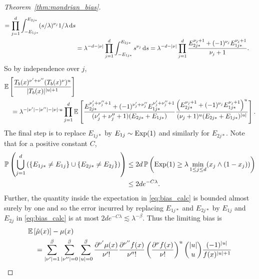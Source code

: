 \begin{proof}[Theorem~\ref{thm:mondrian_bias}]
\begin{align*}
    = \prod_{j=1}^d
    \int_{-E_{1j*}}^{E_{2j*}} (s / \lambda)^{\nu_j} 1/\lambda \,\mathrm{d}s \\
    &=
    \lambda^{-d - |\nu|}
    \prod_{j=1}^d
    \int_{-E_{1j*}}^{E_{2j*}} s^{\nu_j} \,\mathrm{d}s
    = \lambda^{-d - |\nu|}
    \prod_{j=1}^d
    \frac{E_{2j*}^{\nu_j + 1} + (-1)^{\nu_j} E_{1j*}^{\nu_j + 1}}
    {\nu_j + 1}.
  \end{align*}
  So by independence over $j$,
  \begin{align}
    \nonumber
    &\mathbb{E} \left[
      \frac{ T_b(x)^{\nu' + \nu''} (T_b(x)^\nu)^u}{|T_b(x)|^{|u|+1}}
    \right] \\
    \label{eq:bias_calc}
    &\quad=
    \lambda^{- |\nu'| - |\nu''| - |\nu| \cdot u}
    \prod_{j=1}^d
    \mathbb{E} \left[
      \frac{E_{2j*}^{\nu'_j + \nu''_j + 1}
      + (-1)^{\nu'_j + \nu''_j} E_{1j*}^{\nu'_j + \nu''_j + 1}}
      {(\nu'_j + \nu''_j + 1) (E_{2j*} + E_{1j*})}
      \frac{\left(E_{2j*}^{\nu_j + 1}
      + (-1)^{\nu_j} E_{1j*}^{\nu_j + 1}\right)^u}
      {(\nu_j + 1)^u (E_{2j*} + E_{1j*})^{|u|}}
    \right].
  \end{align}
  The final step is to replace $E_{1j*}$
  by $E_{1j} \sim \operatorname{Exp}(1)$ and similarly for $E_{2j*}$.
  Note that for a positive constant $C$,
  \begin{align*}
    \mathbb{P} \left(
      \bigcup_{j=1}^{d}
      \left(
        \left\{
          E_{1j*} \neq E_{1j}
        \right\}
        \cup
        \left\{
          E_{2j*} \neq E_{2j}
        \right\}
      \right)
    \right)
    &\leq
    2d\,
    \mathbb{P} \left(
      \operatorname{Exp}(1) \geq \lambda \min_{1 \leq j \leq d}
      (x_j \wedge (1-x_j))
    \right) \\
    &\leq
    2d e^{-C \lambda}.
  \end{align*}
  Further, the quantity inside the expectation in \eqref{eq:bias_calc}
  is bounded almost surely by one and so
  the error incurred by replacing
  $E_{1j*}$ and $E_{2j*}$ by $E_{1j}$ and $E_{2j}$
  in \eqref{eq:bias_calc}
  is at most $2 d e^{-C \lambda} \lesssim \lambda^{-\beta}$.
  Thus the limiting bias is
  \begin{align}
    \nonumber
    &\E \left[ \hat \mu(x) \right]
    - \mu(x) \\
    \nonumber
    &\quad=
    \sum_{|\nu'|=1}^{\flbeta}
    \sum_{|\nu''|=0}^{\flbeta}
    \sum_{|u|=0}^{\flbeta}
    \frac{\partial^{\nu'} \mu(x)}{\nu' !}
    \frac{\partial^{\nu''} f(x)}{\nu'' !}
    \left( \frac{\partial^\nu f(x)}{\nu !} \right)^u
    \binom{|u|}{u}
    \frac{(-1)^{|u|}}{f(x)^{|u|+1}}

\end{align}
\end{proof}
